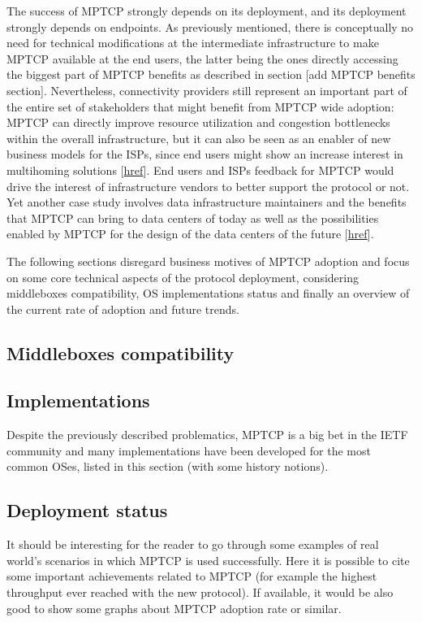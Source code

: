 The success of MPTCP strongly depends on its deployment, and its deployment strongly depends on endpoints. As previously mentioned, there is conceptually no need for technical modifications at the intermediate infrastructure to make MPTCP available at the end users, the latter being the ones directly accessing the biggest part of MPTCP benefits as described in section [add MPTCP benefits section]. Nevertheless, connectivity providers still represent an important part of the entire set of stakeholders that might benefit from MPTCP wide adoption: MPTCP can directly improve resource utilization and congestion bottlenecks within the overall infrastructure, but it can also be seen as an enabler of new business models for the ISPs, since end users might show an increase interest in multihoming solutions [\href{https://books.google.de/books?id=ECBxhiURlKYC&pg=PA23&lpg=PA23&dq=mptcp+deployment&source=bl&ots=_cvPxxdH6K&sig=P5AlF9bU_iE3C63HfXvgD77tUg8&hl=en&sa=X&ved=0ahUKEwi0wMnuscfKAhUB1hQKHT0cARsQ6AEIUzAI#v=onepage&q&f=false}{href}]. End users and ISPs feedback for MPTCP would drive the interest of infrastructure vendors to better support the protocol or not. 
Yet another case study involves data infrastructure maintainers and the benefits that MPTCP can bring to data centers of today as well as the possibilities enabled by MPTCP for the design of the data centers of the future [\href{http://conferences.sigcomm.org/sigcomm/2011/papers/sigcomm/p266.pdf}{href}].


The following sections disregard business motives of MPTCP adoption and focus on some core technical aspects of the protocol deployment, considering middleboxes compatibility, OS implementations status and finally an overview of the current rate of adoption and future trends.

\subsection{Middleboxes compatibility}


\subsection{Implementations}
Despite the previously described problematics, MPTCP is a big bet in the IETF community and many implementations have been developed for the most common OSes, listed in this section (with some history notions).

\subsection{Deployment status}
It should be interesting for the reader to go through some examples of real world's scenarios in which MPTCP is used successfully. Here it is possible to cite some important achievements related to MPTCP (for example the highest throughput ever reached with the new protocol).
If available, it would be also good to show some graphs about MPTCP adoption rate or similar.